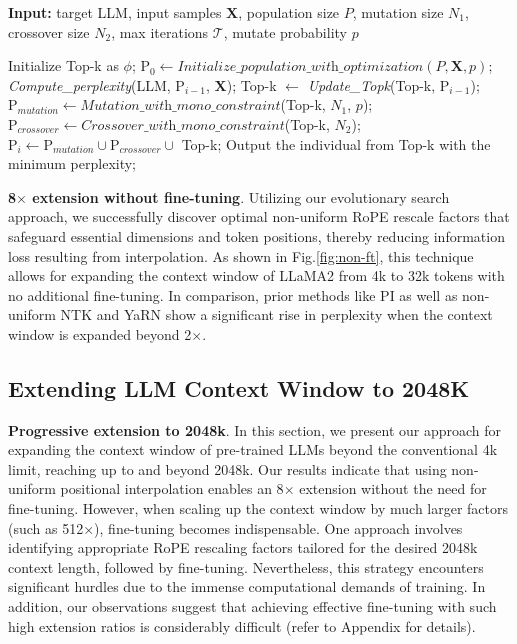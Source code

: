 \begin{algorithm}[t]
	\small
	\caption{The search algorithm}
	\textbf{Input:} target LLM, input samples $\mathbf{X}$,   population size $P$, mutation size $N_1$, crossover size $N_2$, max iterations $\mathcal{T}$, mutate probability $p$\\

	\begin{algorithmic}[1]
		\label{alg:search}
		\STATE Initialize Top-k as $\phi$;	
		\STATE $\text{P}_0 \leftarrow \textit{Initialize\_population\_with\_optimization}(P, \mathbf{X}, p)$; 
		\STATE \textit{Compute\_perplexity}(LLM, $\text{P}_{i-1}$, $\mathbf{X}$);
		\STATE  Top-k $\leftarrow$ \textit{Update\_Topk}(Top-k, $\text{P}_{i-1}$);
		\STATE $\text{P}_{mutation} \leftarrow \textit{Mutation\_with\_mono\_constraint}$(Top-k, $N_1$, $p$); 
		\STATE $\text{P}_{crossover} \leftarrow \textit{Crossover\_with\_mono\_constraint}$(Top-k, $N_2$);
		\STATE $\text{P}_i \leftarrow \text{P}_{mutation} \cup \text{P}_{crossover} \cup$ Top-k;
		\ENDFOR
		\STATE Output the individual from Top-k with the minimum perplexity;
	\end{algorithmic}
\end{algorithm}

\textbf{8$\times$ extension without fine-tuning}. Utilizing our evolutionary search approach, we successfully discover optimal non-uniform RoPE rescale factors that safeguard essential dimensions and token positions, thereby reducing information loss resulting from interpolation. As shown in Fig.\ref{fig:non-ft}, this technique allows for expanding the context window of LLaMA2 from 4k to 32k tokens with no additional fine-tuning. In comparison, prior methods like PI as well as non-uniform NTK and YaRN show a significant rise in perplexity when the context window is expanded beyond 2$\times$.

\subsection{Extending LLM Context Window to 2048K}
\label{sec:extendto2048k}

\textbf{Progressive extension to 2048k}. In this section, we present our approach for expanding the context window of pre-trained LLMs beyond the conventional 4k limit, reaching up to and beyond 2048k. Our results indicate that using non-uniform positional interpolation enables an 8$\times$ extension without the need for fine-tuning. However, when scaling up the context window by much larger factors (such as 512$\times$), fine-tuning becomes indispensable. One approach involves identifying appropriate RoPE rescaling factors tailored for the desired 2048k context length, followed by fine-tuning. Nevertheless, this strategy encounters significant hurdles due to the immense computational demands of training. In addition, our observations suggest that achieving effective fine-tuning with such high extension ratios is considerably difficult (refer to Appendix for details).

